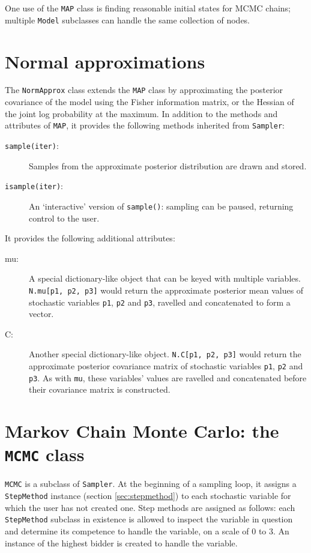One use of the \texttt{MAP} class is finding reasonable initial states for MCMC chains; multiple \texttt{Model} subclasses can handle the same collection of nodes.

\section{Normal approximations} 

The \texttt{NormApprox} class extends the \texttt{MAP} class by approximating the posterior covariance of the model using the Fisher information matrix, or the Hessian of the joint log probability at the maximum. In addition to the methods and attributes of \texttt{MAP}, it provides the following methods inherited from \texttt{Sampler}:
\begin{description}
    \item[\texttt{sample(iter)}:] Samples from the approximate posterior distribution are drawn and stored.
    \item[\texttt{isample(iter)}:] An `interactive' version of \texttt{sample()}: sampling can be paused, returning control to the user.
\end{description}
It provides the following additional attributes:
\begin{description}
    \item[mu:] A special dictionary-like object that can be keyed with multiple variables. \texttt{N.mu[p1, p2, p3]} would return the approximate posterior mean values of stochastic variables \texttt{p1}, \texttt{p2} and \texttt{p3}, ravelled and concatenated to form a vector.
    \item[C:] Another special dictionary-like object. \texttt{N.C[p1, p2, p3]} would return the approximate posterior covariance matrix of stochastic variables \texttt{p1}, \texttt{p2} and \texttt{p3}. As with \texttt{mu}, these variables' values are ravelled and concatenated before their covariance matrix is constructed.
\end{description}

\section{Markov Chain Monte Carlo: the \texttt{MCMC} class}
 \texttt{MCMC} is a subclass of \texttt{Sampler}. At the beginning of a sampling loop, it assigns a \texttt{StepMethod} instance (section \ref{sec:stepmethod}) to each stochastic variable for which the user has not created one. Step methods are assigned as follows: each \texttt{StepMethod} subclass in existence is allowed to inspect the variable in question and determine its competence to handle the variable, on a scale of 0 to 3. An instance of the highest bidder is created to handle the variable.

